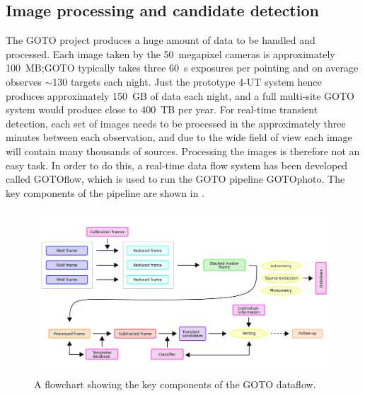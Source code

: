 \begin{colsection}
\newpage

\end{colsection}


\subsection{Image processing and candidate detection}
\label{sec:gotophoto}
\begin{colsection}

The GOTO project produces a huge amount of data to be handled and processed. Each image taken by the  50~megapixel cameras is approximately 100~MB;\@ GOTO typically takes three \SI{60}{\second} exposures per pointing and on average observes $\sim$130 targets each night. Just the prototype 4-UT system hence produces approximately 150~GB of data each night, and a full multi-site GOTO system would produce close to 400~TB per year. For real-time transient detection, each set of images needs to be processed in the approximately three minutes between each observation, and due to the wide field of view each image will contain many thousands of sources. Processing the images is therefore not an easy task. In order to do this, a real-time data flow system has been developed called GOTOflow, which is used to run the GOTO pipeline GOTOphoto. The key components of the pipeline are shown in .

\begin{figure}[t]
    \begin{center}
        \includegraphics[width=\linewidth]{images/pipeline.png}
    \end{center}
    \caption[The GOTO dataflow]{
        A flowchart showing the key components of the GOTO dataflow.
    }\label{fig:gotoflow}
\end{figure}


\end{colsection}
